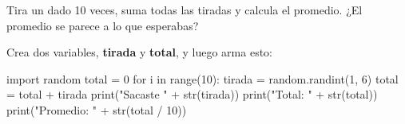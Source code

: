 
Tira un dado 10 veces, suma todas las tiradas y calcula el promedio. ¿El promedio se parece a lo que esperabas?

Crea dos variables, \textbf{tirada} y \textbf{total}, y luego arma esto:

\begin{center}
\begin{scratch}
\end{scratch}
\end{center}


\begin{typethis}
import random
total = 0
for i in range(10):
    tirada = random.randint(1, 6)
    total = total + tirada
    print("Sacaste " + str(tirada))
print("Total: " + str(total))
print("Promedio: " + str(total / 10))
\end{typethis}


